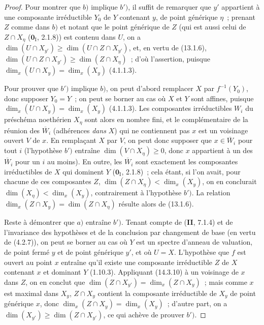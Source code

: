 \begin{proof}
Pour montrer que $b)$ implique $b')$, il suffit de remarquer que $y'$ appartient à
une composante irréductible $Y_0$ de $Y$ contenant $y$, de point générique $\eta$~;
prenant $Z$ comme dans $b)$ et notant que le point générique de $Z$ (qui est aussi
celui de $Z\cap X_\eta$ ($\mathbf{0}_{\mathrm I}$, 2.1.8)) est contenu dans $U$, on
a $\dim(U\cap X_{y'})\geq\dim(U\cap Z\cap X_{y'})$, et, en vertu de (13.1.6),
$\dim(U\cap Z\cap X_{y'})\geq\dim(Z\cap X_\eta)$~; d'où l'assertion, puisque
$\dim_x(U\cap X_y)=\dim_x(X_y)$ (4.1.1.3).

Pour prouver que $b')$ implique $b)$, on peut d'abord remplacer $X$ par
$f^{-1}(Y_0)$, donc supposer $Y_0=Y$~; on peut se borner au cas où $X$ et $Y$ sont
affines, puisque $\dim_x(U\cap X_y)=\dim_x(X_y)$ (4.1.1.3). Les composantes
irréductibles $W_i$ du préschéma noethérien $X_\eta$ sont alors en nombre fini, et
le complémentaire de la réunion des $\overline W_i$ (adhérences \emph{dans} $X$) qui ne
contiennent pas $x$ est un voisinage ouvert $V$ de $x$. En remplaçant $X$ par $V$,
on peut donc supposer que $x\in\overline W_i$ pour tout $i$ (l'hypothèse $b')$
entraîne $\dim(V\cap X_\eta)\geq 0$, donc $x$ appartient à un des $\overline W_i$
pour un $i$ au moins). En outre, les $\overline W_i$ sont exactement les
composantes irréductibles de $X$ qui dominent $Y$ ($\mathbf{0}_{\mathrm I}$,
2.1.8)~; cela étant, si l'on avait, pour chacune de ces composantes $Z$,
$\dim(Z\cap X_\eta)<\dim_x(X_y)$, on en conclurait
$\dim(X_\eta)<\dim_x(X_y)$, contrairement à l'hypothèse $b')$. La relation
$\dim_x(Z\cap X_y)=\dim(Z\cap X_\eta)$ résulte alors de (13.1.6).

Reste à démontrer que $a)$ entraîne $b')$. Tenant compte de (\textbf{II}, 7.1.4)
et de l'invariance des hypothèses et de la conclusion par changement de base (en
vertu de (4.2.7)), on peut se borner au cas où $Y$ est un spectre d'anneau de
valuation, de point fermé $y$ et de point générique $y'$, et où $U=X$.
L'hypothèse que $f$ est ouvert au point $x$ entraîne qu'il existe une composante
irréductible $Z$ de $X$ contenant $x$ et dominant $Y$ (1.10.3). Appliquant
(14.3.10) à un voisinage de $x$ dans $Z$, on en conclut que
$\dim(Z\cap X_{y'})=\dim_x(Z\cap X_y)$~; mais comme $x$ est maximal dans $X_y$,
$Z\cap X_y$ contient la composante irréductible de $X_y$ de point générique $x$,
donc $\dim_x(Z\cap X_y)=\dim_x(X_y)$~; d'autre part, on a
$\dim(X_{y'})\geq\dim(Z\cap X_{y'})$, ce qui achève de prouver $b')$.
\end{proof}

